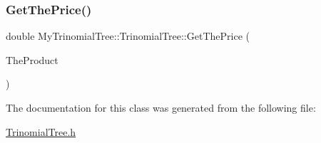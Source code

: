 \hypertarget{classMyTrinomialTree_1_1TrinomialTree_a2627d85fdca2354085193486755b81e2}{}\label{classMyTrinomialTree_1_1TrinomialTree_a2627d85fdca2354085193486755b81e2} 
\subsubsection{\texorpdfstring{Get\+The\+Price()}{GetThePrice()}}
{\footnotesize\ttfamily double My\+Trinomial\+Tree\+::\+Trinomial\+Tree\+::\+Get\+The\+Price (\begin{DoxyParamCaption}\item[{const \hyperlink{classTreeProduct}{Tree\+Product} \&}]{The\+Product }\end{DoxyParamCaption})}



The documentation for this class was generated from the following file\+:\begin{DoxyCompactItemize}
\item 
\hyperlink{TrinomialTree_8h}{Trinomial\+Tree.\+h}\end{DoxyCompactItemize}
